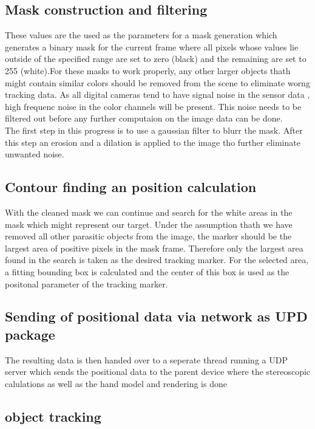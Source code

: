 \subsection{Mask construction and filtering}
These values are the used as the parameters for a mask generation which generates a binary mask for the current frame where all pixels whose values lie outside of the specified range are set to zero (black) and the remaining are set to 255 (white).For these masks to work properly, any other larger objects thath might contain similar colors should be removed from the scene to eliminate worng tracking data. As all digital cameras tend to have signal noise in the sensor data , high frequenc  noise in the color channels will be present. This noise needs to be filtered out before any further computaion on the image data can be done.\\
The first step in this progress is to use a gaussian filter to blurr the mask. After this step an erosion and a dilation is applied to the image tho further eliminate unwanted noise.
\subsection{Contour finding an position calculation}
With the cleaned mask we can continue and search for the white areas in the mask which might represent our target. Under the assumption thath we have removed all other parasitic objects from the image, the marker should be the largest area of positive pixels in the mask frame. Therefore only the largest area found in the search is taken as the desired tracking marker. For the selected area, a fitting bounding box is calculated and the center of this box is used as the positonal parameter of the tracking marker.
\subsection{Sending of positional data via network as UPD package}
The resulting data is then handed over to a seperate thread running a UDP server which sends the positional data to the parent device where the stereoscopic calulations as well as the hand model and rendering is done
\subsection{object tracking}



 




